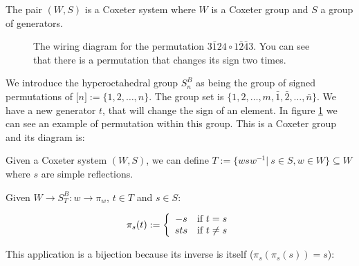 \begin{definition}
  The pair $(W,S)$ is a Coxeter system where $W$ is a Coxeter group and $S$ a group of generators.
\end{definition}

\begin{figure}
  \begin {center}
  \caption{The wiring diagram for the permutation  $3\bar{1}24 \circ 1\bar{2}\bar{4}3$. You can see that there is a permutation that changes its sign two times.}
  \end{center}
\label{fig:wiring_snB}
\end{figure}

We introduce the hyperoctahedral group $S_n^B$ as being the group of signed permutations of $\big[n\big] := \{1, 2, \dots, n\}$. The group set is $\{1,2,\dots,m,\bar{1}, \bar{2},\dots, \bar{n}\}$. We have a new generator $t$, that will change the sign of an element. In figure \ref{fig:wiring_snB} we can see an example of permutation within this group. This is a Coxeter group and its diagram is:

\begin{center}
\end{center}

Given a Coxeter system $(W,S)$, we can define $T := \{wsw^{-1} |\ s\in S, w \in W\} \subseteq W$ where $s$ are simple reflections.

\begin{definition}
  Given $W \to S_T^B : w \to \pi_w$, $t\in T$ and $s\in S$:

  \begin{equation}
    \pi_s(t) := \left \{
    \begin{array}{c @{} c}
        -s \quad &\text{if } t = s \\
        sts \quad &\text{if } t \neq s \\
    \end{array}\right.
  \end{equation}
\end{definition}
This application is a bijection because its inverse is itself ($\pi_s(\pi_s(s)) = s$):

